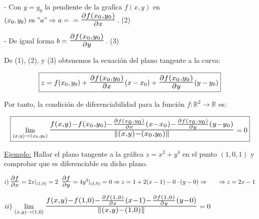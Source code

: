 \documentclass[12pt, titlepage]{article}
\newcommand{\R}{\mathbb{R}}
\newcommand{\bfrac}[2]{\scalebox{1.4}{$\frac{#1}{#2}$}}
\newcommand{\spac}{\, \, \,}
\begin{document}
- Con $y = y_0$ la pendiente de la grafíca $f (x, y)$ en $(x_0, y_0) \text{ es } "a" \Rightarrow a = \\ =
\bfrac{\partial f (x_0, y_0)}{\partial x}$. (2)
\vspace{3mm}

- De igual forma $b = \bfrac{\partial f (x_0, y_0)}{\partial y}$. (3)
\vspace{3mm}

De (1), (2), y (3) obtenemos la ecuación del plano tangente a la curva:

\[
\boxed{
z = f (x_0, y_0) + \bfrac{\partial f (x_0, y_0)}{\partial x} (x - x_0) + \bfrac{\partial f (x_0, y_0)}{\partial y} 
(y - y_0)
}
\]

Por tanto, la condición de diferenciabilidad para la función $f : \R^2 \to \R$ es:

\[
\boxed{
\displaystyle \lim_{(x, y) \to (x_0, y_0)} \bfrac{f (x, y) - f  (x_0, y_0) - \frac{\partial f (x_0, y_0)}{\partial x} 
(x - x_0) - \frac{\partial f (x_0, y_0)}{\partial y} (y - y_0)}{\|(x, y) - (x_0, y_0)\|} = 0
}
\]
\vspace{3mm}

\underline{Ejemplo:} Hallar el plano tangente a la gráfica $z = x^2 + y^4$ en el punto $(1, 0, 1)$ y 
comprobar que es diferenciable en dicho plano.
\vspace{3mm}

$i) \, \bfrac{\partial f}{\partial x} = 2x |_{(1, 0)} = 2 \spac \bfrac{\partial f}{\partial y} = 4 y^3 |_{(1, 0)} = 
0 \Rightarrow z = 1 + 2(x -1) - 0 \cdot (y - 0) \Rightarrow \\ \indent \Rightarrow z = 2x -1$
\vspace{3mm}

$ii) \, \displaystyle \lim_{(x, y) \to (1, 0)} \bfrac{f (x, y) - f(1, 0) - \frac{\partial f (1, 0)}{\partial x} (x -1) - 
\frac{\partial f (1, 0)}{\partial y} (y - 0)}{\|(x, y) - (1, 0)\|} = 0$
\end{document}
